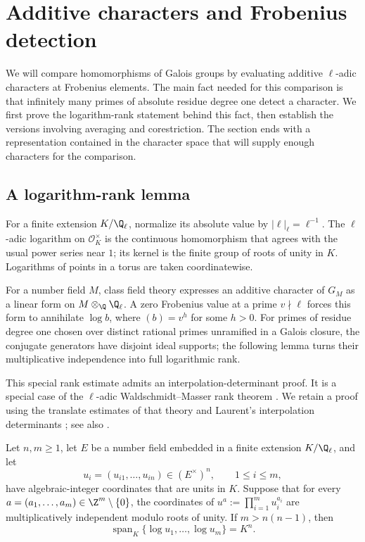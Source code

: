 \section{Additive characters and Frobenius detection}\label{sec:characters}

We will compare homomorphisms of Galois groups by evaluating additive
$\ell$-adic characters at Frobenius elements.  The main fact needed for
this comparison is that infinitely many primes of absolute residue
degree one detect a character.  We first prove the logarithm-rank
statement behind this fact, then establish the versions involving
averaging and corestriction.  The section ends with a representation
contained in the character space that will supply enough characters for
the comparison.

\subsection{A logarithm-rank lemma}

For a finite extension $K/\Q_\ell$, normalize its absolute value by
$|\ell|_\ell=\ell^{-1}$.  The $\ell$-adic logarithm on
$\mathcal O_K^\times$ is the continuous homomorphism that agrees with
the usual power series near $1$; its kernel is the finite group of
roots of unity in $K$.  Logarithms of points in a torus are taken
coordinatewise.

For a number field $M$, class field theory expresses an additive
character of $G_M$ as a linear form on $M\otimes_\Q\Q_\ell$.
A zero Frobenius value at a prime $v\nmid\ell$ forces this form to
annihilate $\log b$, where $(b)=v^h$ for some $h>0$.
For primes of residue degree one chosen over distinct rational primes
unramified in a Galois closure, the conjugate generators have disjoint
ideal supports; the following lemma turns their multiplicative
independence into full logarithmic rank.

This special rank estimate admits an
interpolation-determinant proof.  It is a special case of the
$\ell$-adic Waldschmidt--Masser rank theorem
\cite{waldschmidt1981,masser1981}.  We retain a proof using the
translate estimates of that theory and Laurent's interpolation
determinants \cite{laurent1991}; see also
\cite[Theorems~5.1 and~5.8]{dasgupta2023}.

\begin{lemma}\label{lem:log-rank}
Let $n,m\geq1$, let $E$ be a number field embedded in a finite
extension $K/\Q_\ell$, and let
\[
 u_i=(u_{i1},\ldots,u_{in})\in(E^\times)^n,
 \qquad 1\leq i\leq m,
\]
have algebraic-integer coordinates that are units in $K$.  Suppose that
for every $a=(a_1,\ldots,a_m)\in\Z^m\setminus\{0\}$, the coordinates
of $u^a:=\prod_{i=1}^m u_i^{a_i}$ are multiplicatively independent
modulo roots of unity.  If $m>n(n-1)$, then
\[
 \operatorname{span}_K\{\log u_1,\ldots,\log u_m\}=K^n.
\]
\end{lemma}

